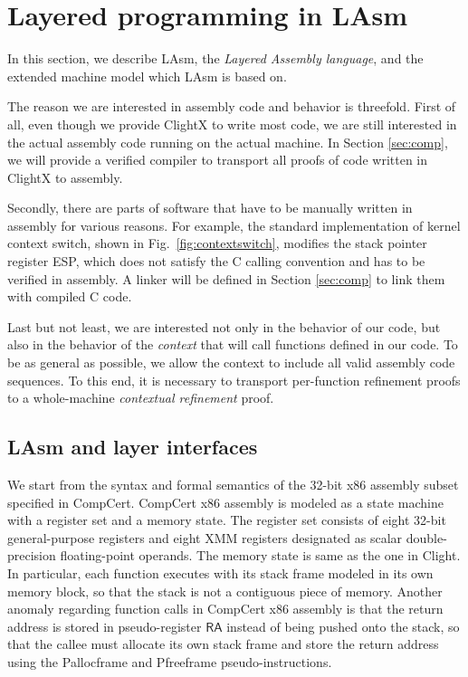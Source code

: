 
\section{Layered programming in LAsm}
\label{sec:lasm}

In this section, we describe LAsm, the \emph{Layered
  Assembly language}, and the extended machine model which LAsm is based on.

The reason we are interested in assembly code and behavior is
threefold.  First of all, even though we provide ClightX to write most
code, we are still interested in the actual assembly code running on
the actual machine. In Section \ref{sec:comp}, we will provide a
verified compiler to transport all proofs of code written in ClightX
to assembly.

Secondly, there are parts of software that have to be manually written
in assembly for various reasons. For example, the standard
implementation of kernel context switch, shown in
Fig.~\ref{fig:contextswitch}, 
modifies the stack pointer register
\textsf{ESP}, which does not satisfy the C calling convention and has
to be verified in assembly.  A linker will be defined in Section
\ref{sec:comp} to link them with compiled C code.

Last but not least, we are interested not only in the behavior of our
code, but also in the behavior of the \emph{context} that will call
functions defined in our code. To be as general as possible, we allow
the context to include all valid assembly code sequences. To this end,
it is necessary to transport per-function refinement proofs to a
whole-machine \emph{contextual refinement} proof.


  \subsection{LAsm and layer interfaces}

We start from the syntax and formal semantics of the 32-bit x86
assembly subset specified in CompCert.
CompCert x86 assembly is
modeled as a state machine with a register set and a memory state. 
The register set
consists of eight 32-bit general-purpose registers and eight XMM registers
designated as scalar double-precision floating-point operands.
The memory state is same as the one in Clight.
In particular, each function executes with its stack frame modeled in its
own memory block, so that the stack is not a contiguous piece of
memory.
Another anomaly regarding function calls in CompCert x86 assembly is that
the return address is stored in pseudo-register $\mathsf{RA}$ instead of
being pushed onto the stack, so
that the callee must allocate its own stack frame and
store the return address%
using the \textsf{Pallocframe} and
\textsf{Pfreeframe} pseudo-instructions.

